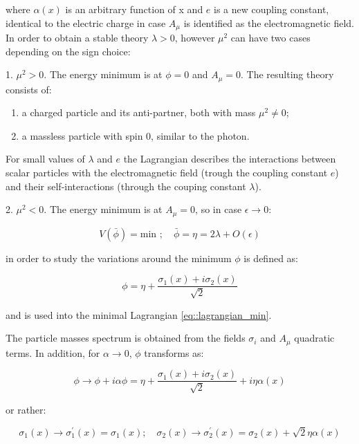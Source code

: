 where $\alpha(x)$ is an arbitrary function of x and $e$ is a new coupling constant, identical to the electric charge in case $A_{\mu}$ is identified as the electromagnetic field. In order to obtain a stable theory $\lambda > 0$, however $\mu^{2}$ can have two cases depending on the sign choice:
 
1. $\mu^{2} > 0$. The energy minimum is at $\phi = 0$ and $A_{\mu} = 0$. The resulting theory consists of:

\begin{enumerate}
	\item a charged particle and its anti-partner, both with mass $\mu^{2} \neq 0$;
	\item a massless particle with spin 0, similar to the photon.
\end{enumerate}

For small values of $\lambda$ and $e$ the Lagrangian describes the interactions between scalar particles with the electromagnetic field (trough the coupling constant $e$) and their self-interactions (through the couping constant $\lambda$).

2. $\mu^{2} < 0$. The energy minimum is at $A_{\mu} = 0$, so in  case $\epsilon \rightarrow 0$:

\begin{equation}
V(\bar{\phi}) = \text{min }; \quad \bar{\phi}=\eta= 2\lambda +O(\epsilon)
\end{equation}
 
 in order to study the  variations around the minimum $\phi$ is defined as:

\begin{equation}
 \phi=\eta + \dfrac{\sigma_{1}(x) + i\sigma_{2}(x)}{\sqrt{2}} 
\end{equation}

and is used into the minimal Lagrangian \ref{eq::lagrangian_min}.

The particle masses spectrum is obtained from the fields $\sigma_{i}$ and $A_{\mu}$ quadratic terms. In addition, for $\alpha \rightarrow 0$, $\phi$ transforms as:

\begin{equation}
\phi \rightarrow \phi + i\alpha\phi = \eta + \dfrac{\sigma_{1}(x) + i\sigma_{2}(x)}{\sqrt{2}} + i\eta\alpha(x)
\end{equation}

or rather:

\begin{equation}
\sigma_{1}(x) \rightarrow \sigma^{\prime}_{1}(x) = σ_{1}(x); \quad \sigma_{2}(x) \rightarrow \sigma^{\prime}_{2}(x) = \sigma_{2}(x) + \sqrt{2}\eta\alpha(x)
\end{equation}

